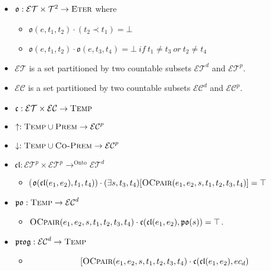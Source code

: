 \begin{itemize}
	\item $\mathfrak{o} : \mathcal{ET} \times \mathcal{T}^2 \to \textsc{Eter}$ where
	      \begin{itemize}
		      \item $\mathfrak{o}(e, t_1, t_2) \cdot (t_2 \prec t_1) = \bot$
		      \item $\mathfrak{o}(e, t_1, t_2) \cdot \mathfrak{o}(e, t_3, t_4) = \bot  \ if \ t_1 \neq t_3 \ or \  t_2 \neq t_4$
	      \end{itemize}
	\item $\mathcal{ET}$ is a set partitioned by two countable subsets $\mathcal{ET}^d$ and $\mathcal{ET}^p$.
	\item $\mathcal{EC}$ is a set partitioned by two countable subsets $\mathcal{EC}^d$ and $\mathcal{EC}^p$.
	\item $\mathfrak{c} : \mathcal{ET} \times \mathcal{EC} \to \textsc{Temp}$
	\item $\uparrow :  \textsc{Temp} \cup \textsc{Prem} \to \mathcal{EC}^p$
	\item $\downarrow :  \textsc{Temp} \cup \textsc{Co-Prem} \to \mathcal{EC}^p$
	\item $\mathfrak{cl} : \mathcal{ET}^p \times \mathcal{ET}^p \to^{\text{Onto}} \mathcal{ET}^d$
	      \begin{itemize}
		      \item ($\mathfrak{o}(\mathfrak{cl}(e_1, e_2), t_1, t_4))  \cdot (\exists s, t_3, t_4)[
				            \textsc{OCpair}(e_1, e_2, s, t_1, t_2, t_3, t_4) ] = \top$
	      \end{itemize}
	\item $\mathfrak{po} : \textsc{Temp} \to \mathcal{EC}^d$
	      \begin{itemize}
		      \item $\textsc{OCpair}(e_1, e_2, s, t_1, t_2, t_3, t_4) \cdot \mathfrak{c}(\mathfrak{cl}(e_1, e_2), \mathfrak{po}(s)) = \top$.
	      \end{itemize}
	\item $\mathfrak{prog} : \mathcal{EC}^d \to \textsc{Temp}$
	      \begin{itemize}
		      \item \[
			            [
					            \textsc{OCpair}(e_1, e_2, s, t_1, t_2, t_3, t_4) \cdot \mathfrak{c}(\mathfrak{cl} (e_1, e_2), ec_d)
\]
\end{itemize}
\end{itemize}
